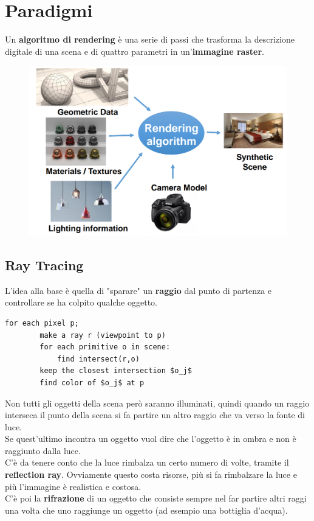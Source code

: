 \newpage

\section{Paradigmi}
Un \textbf{algoritmo di rendering} è una serie di passi che trasforma la descrizione digitale di una scena e di quattro parametri in un'\textbf{immagine raster}.\\
\begin{figure}[h]
	\includegraphics[scale=0.25]{rendering_algorithm.png}
	\centering
\end{figure}

\subsection{Ray Tracing}
L'idea alla base è quella di "sparare" un \textbf{raggio} dal punto di partenza e controllare se ha colpito qualche oggetto.
\begin{lstlisting}[mathescape=true]
	for each pixel p;
		make a ray r (viewpoint to p)
		for each primitive o in scene:
			find intersect(r,o)
		keep the closest intersection $o_j$
		find color of $o_j$ at p
\end{lstlisting}
Non tutti gli oggetti della scena però saranno illuminati, quindi quando un raggio interseca il punto della scena si fa partire un altro raggio che va verso la fonte di luce.\\
Se quest'ultimo incontra un oggetto vuol dire che l'oggetto è in ombra e non è raggiunto dalla luce.\\
C'è da tenere conto che la luce rimbalza un certo numero di volte, tramite il \textbf{reflection ray}. Ovviamente questo costa risorse, più si fa rimbalzare la luce e più l'immagine è realistica e costosa.\\
C'è poi la \textbf{rifrazione} di un oggetto che consiste sempre nel far partire altri raggi una volta che uno raggiunge un oggetto (ad esempio una bottiglia d'acqua).
